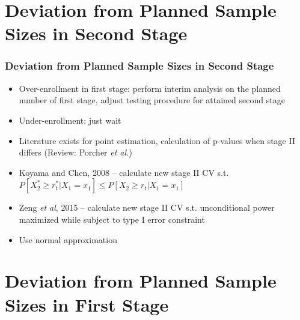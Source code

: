 \documentclass{beamer}\usepackage[]{graphicx}\usepackage[]{color}
\begin{document}
\section{Deviation from Planned Sample Sizes in Second Stage}

\begin{frame}
\frametitle{Deviation from Planned Sample Sizes in Second Stage}
    \begin{itemize}
        \item Over-enrollment in first stage: perform interim analysis on the planned number of first stage, adjust testing procedure for attained second stage %
        \item Under-enrollment: just wait
        \item Literature exists for point estimation, calculation of p-values when stage II differs (Review: Porcher \textit{et al.})
        \item Koyama and Chen, 2008 -- calculate new stage II CV s.t. $P[X_2^\ast \geq r_t^\ast \vert X_1 = x_1] \leq P[X_2 \geq r_t \vert X_1 = x_1]$ %
        \item Zeng \textit{et al}, 2015 -- calculate new stage II CV s.t. unconditional power maximized while subject to type I error constraint
        \item Use normal approximation 
    \end{itemize}
\end{frame}

\section{Deviation from Planned Sample Sizes in First Stage}
\end{document}
